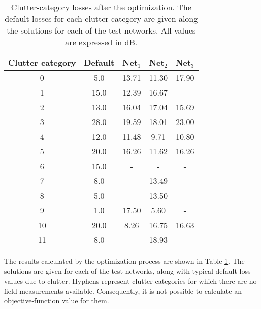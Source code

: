 \begin{table}
\caption{Clutter-category losses after the optimization. The default losses
for each clutter category are given along the solutions for each of
the test networks. All values are expressed in dB. \label{tab:Clutter-optimization-solutions}}


{\footnotesize \centering}{\footnotesize \par}

{\footnotesize }%
\begin{tabular}{ccccc}
\hline 
{\footnotesize Clutter category} & {\footnotesize Default} & {\footnotesize Net$_{1}$} & {\footnotesize Net$_{2}$} & {\footnotesize Net$_{3}$}\tabularnewline
\hline 
{\footnotesize 0} & {\footnotesize 5.0} & {\footnotesize 13.71} & {\footnotesize 11.30} & {\footnotesize 17.90}\tabularnewline
{\footnotesize 1} & {\footnotesize 15.0} & {\footnotesize 12.39} & {\footnotesize 16.67} & {\footnotesize -}\tabularnewline
{\footnotesize 2} & {\footnotesize 13.0} & {\footnotesize 16.04} & {\footnotesize 17.04} & {\footnotesize 15.69}\tabularnewline
{\footnotesize 3} & {\footnotesize 28.0} & {\footnotesize 19.59} & {\footnotesize 18.01} & {\footnotesize 23.00}\tabularnewline
{\footnotesize 4} & {\footnotesize 12.0} & {\footnotesize 11.48} & {\footnotesize 9.71} & {\footnotesize 10.80}\tabularnewline
{\footnotesize 5} & {\footnotesize 20.0} & {\footnotesize 16.26} & {\footnotesize 11.62} & {\footnotesize 16.26}\tabularnewline
{\footnotesize 6} & {\footnotesize 15.0} & {\footnotesize -} & {\footnotesize -} & {\footnotesize -}\tabularnewline
{\footnotesize 7} & {\footnotesize 8.0} & {\footnotesize -} & {\footnotesize 13.49} & {\footnotesize -}\tabularnewline
{\footnotesize 8} & {\footnotesize 5.0} & {\footnotesize -} & {\footnotesize 13.50} & {\footnotesize -}\tabularnewline
{\footnotesize 9} & {\footnotesize 1.0} & {\footnotesize 17.50} & {\footnotesize 5.60} & {\footnotesize -}\tabularnewline
{\footnotesize 10} & {\footnotesize 20.0} & {\footnotesize 8.26} & {\footnotesize 16.75} & {\footnotesize 16.63}\tabularnewline
{\footnotesize 11 } & {\footnotesize 8.0} & {\footnotesize -} & {\footnotesize 18.93} & {\footnotesize -}\tabularnewline
\hline 
\end{tabular}
\end{table}


The results calculated by the optimization process are shown in Table
\ref{tab:Clutter-optimization-solutions}. The solutions are given
for each of the test networks, along with typical default loss values
due to clutter. Hyphens represent clutter categories for which there
are no field measurements available. Consequently, it is not possible
to calculate an objective-function value for them.

